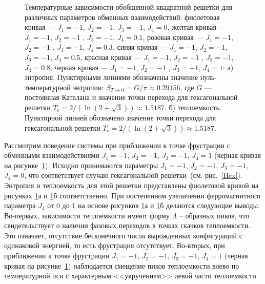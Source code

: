 \begin{figure}[h]
	\begin{minipage}[h]{0.5\linewidth}
	\end{minipage}
	\hfill
	\begin{minipage}[h]{0.5\linewidth}
	\end{minipage}
	\caption{Температурные зависимости обобщенной квадратной решетки для различных параметров обменных взаимодействий: фиолетовая кривая --- $J_1 = -1$, $J_2 = -1$, $J_3 = -1$, $J_4 = 0$, желтая кривая --- $J_1 = -1$, $J_2 = -1$ , $J_3 = -1$, $J_4 = 0.1$, розовая кривая --- $J_1 = -1$, $J_2 = -1$ , $J_3 = -1$, $J_4 = 0.3$, синяя кривая --- $J_1 = -1$, $J_2 = -1$, $J_3 = -1$, $J_4 = 0.5$, красная кривая --- $J_1 = -1$, $J_2 = -1$ , $J_3 = -1$, $J_4 = 0.8$, черная кривая --- $J_1 = -1$, $J_2 = -1$ , $J_3 = -1$, $J_4 = 1$: а) энтропия. Пунктирными линиями обозначены значение нуль-температурной энтропии: $S_{T\rightarrow 0} = G/\pi\approx 0.29156$, где $G$ --- постоянная Каталана и значение точки перехода для гексагональной решетки $T_c = 2/(\ln(2+\sqrt{3}))\approx 1.5187$. б) теплоемкость. Пунктирной линией обозначено значение точки перехода для гексагональной решетки $T_c = 2/(\ln(2+\sqrt{3}))\approx 1.5187$. }
	\label{Peak2}
\end{figure}

Рассмотрим поведение системы при приближении к точке фрустрации с обменными взаимодействиями $J_1 = -1$, $J_2 = -1$, $J_3 = -1$, $J_4 = 1$ (черная кривая на рисунке~\ref{Peak2}). Исходно принимаются параметры $J_1 = -1$, $J_2 = -1$, $J_3 = -1$, $J_4 = 0$, что соответствует случаю гексагональной решетки~(см. рис.~\ref{Hex}). Энтропия и теплоемкость для этой решетки представлены фиолетовой кривой на рисунках \ref{Peak2}а и \ref{Peak2}б соответственно. При постепенном увеличении ферромагнитного параметра $J_4$ от $0$ до $1$ на основе рисунков \ref{Peak2}а и \ref{Peak2}б делаются следующие выводы. Во-первых, зависимости теплоемкости имеют форму $\Lambda$ -- образных пиков, что свидетельствует о наличии фазовых переходов в точках скачков теплоемкости. Это означает, отсутствие бесконечного числа вырожденных конфигураций с одинаковой энергией, то есть фрустрация отсутствует. Во-вторых, при приближении к точке фрустрации $J_1 = -1$, $J_2 = -1$, $J_3 = -1$, $J_4 = 1$ (черная кривая на рисунке~\ref{Peak2}) наблюдается смещение пиков теплоемкости влево по температурной оси с характерным <<укручением>> левой части теплоемкости.

